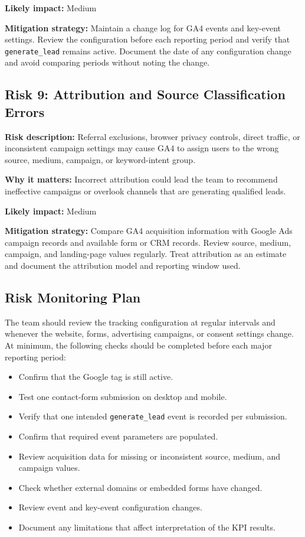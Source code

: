 \documentclass[
  letterpaper,
  DIV=11,
  numbers=noendperiod]{scrartcl}
\providecommand{\tightlist}{%
  \setlength{\itemsep}{0pt}\setlength{\parskip}{0pt}}
\begin{document}
\textbf{Likely impact:} Medium

\textbf{Mitigation strategy:} Maintain a change log for GA4 events and
key-event settings. Review the configuration before each reporting
period and verify that \texttt{generate\_lead} remains active. Document
the date of any configuration change and avoid comparing periods without
noting the change.

\subsection{Risk 9: Attribution and Source Classification
Errors}\label{risk-9-attribution-and-source-classification-errors}

\textbf{Risk description:} Referral exclusions, browser privacy
controls, direct traffic, or inconsistent campaign settings may cause
GA4 to assign users to the wrong source, medium, campaign, or
keyword-intent group.

\textbf{Why it matters:} Incorrect attribution could lead the team to
recommend ineffective campaigns or overlook channels that are generating
qualified leads.

\textbf{Likely impact:} Medium

\textbf{Mitigation strategy:} Compare GA4 acquisition information with
Google Ads campaign records and available form or CRM records. Review
source, medium, campaign, and landing-page values regularly. Treat
attribution as an estimate and document the attribution model and
reporting window used.

\subsection{Risk Monitoring Plan}\label{risk-monitoring-plan}

The team should review the tracking configuration at regular intervals
and whenever the website, forms, advertising campaigns, or consent
settings change. At minimum, the following checks should be completed
before each major reporting period:

\begin{itemize}
\tightlist
\item
  Confirm that the Google tag is still active.
\item
  Test one contact-form submission on desktop and mobile.
\item
  Verify that one intended \texttt{generate\_lead} event is recorded per
  submission.
\item
  Confirm that required event parameters are populated.
\item
  Review acquisition data for missing or inconsistent source, medium,
  and campaign values.
\item
  Check whether external domains or embedded forms have changed.
\item
  Review event and key-event configuration changes.
\item
  Document any limitations that affect interpretation of the KPI
  results.
\end{itemize}
\end{document}

